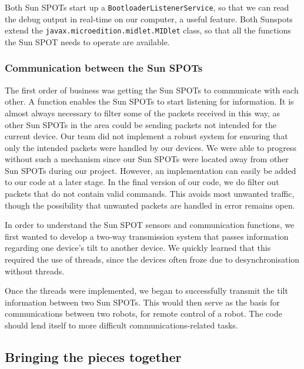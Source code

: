 \documentclass[a4paper,10pt]{article} %
\begin{document}
Both Sun SPOTs start up a \texttt{BootloaderListenerService}, so that we can
read the debug output in real-time on our computer, a useful feature. Both
Sunspots extend the \texttt{javax.microedition.midlet.MIDlet} class, so that all
the functions the Sun SPOT needs to operate are available.

\subsubsection{Communication between the Sun SPOTs} %
\label{subsec:comm}

The first order of business was getting the Sun SPOTs to communicate with each
other. A function enables the Sun SPOTs to start listening for information. It
is almost always necessary to filter some of the packets received in this way,
as other Sun SPOTs in the area could be sending packets not intended for the
current device.  Our team did not implement a robust system for ensuring that
only the intended packets were handled by our devices. We were able to progress
without such a mechanism since our Sun SPOTs were located away from other Sun
SPOTs during our project. However, an implementation can easily be added to our
code at a later stage. In the final version of our code, we do filter out
packets that do not contain valid commands. This avoids most unwanted traffic,
though the possibility that unwanted packets are handled in error remains open.

In order to understand the Sun SPOT sensors and communication functions, we
first wanted to develop a two-way transmission system that passes information
regarding one device's tilt to another device. We quickly learned that this
required the use of threads, since the devices often froze due to
desynchronisation without threads. 

Once the threads were implemented, we began to successfully transmit the tilt
information between two Sun SPOTs. This would then serve as the basis for
communications between two robots, for remote control of a robot. The code
should lend itself to more difficult communications-related tasks.



\subsection{Bringing the pieces together} %
\label{subsec:Bringing the pieces together}
\end{document}
